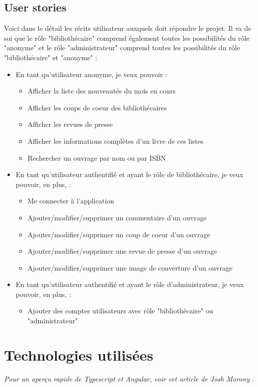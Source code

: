 \documentclass[a4paper, 12pt]{article}
\begin{document}
\subsection{User stories}
Voici dans le détail les récits utilisateur auxquels doit répondre le projet. Il va de soi que le rôle "bibliothécaire"
comprend également toutes les possibilités du rôle "anonyme" et le rôle "administrateur" comprend toutes les possibilités
du rôle "bibliothécaire" et "anonyme" :
\begin{itemize}
    \item En tant qu'utilisateur anonyme, je veux pouvoir :
    \begin{itemize}
        \item Afficher la liste des nouveautés du mois en cours
        \item Afficher les coups de coeur des bibliothécaires
        \item Afficher les revues de presse
        \item Afficher les informations complètes d'un livre de ces listes
        \item Rechercher un ouvrage par nom ou par ISBN
    \end{itemize}
    \item En tant qu'utilisateur authentifié et ayant le rôle de bibliothécaire, je veux pouvoir, en plus, :
    \begin{itemize}
        \item Me connecter à l'application
        \item Ajouter/modifier/supprimer un commentaire d'un ouvrage
        \item Ajouter/modifier/supprimer un coup de coeur d'un ouvrage
        \item Ajouter/modifier/supprimer une revue de presse d'un ouvrage
        \item Ajouter/modifier/supprimer une image de couverture d'un ouvrage
    \end{itemize}
    \item En tant qu'utilisateur authentifié et ayant le rôle d'administrateur, je veux pouvoir, en plus, :
    \begin{itemize}
        \item Ajouter des comptes utilisateurs avec rôle "bibliothécaire" ou "administrateur"
    \end{itemize}
\end{itemize}

\section{Technologies utilisées}
\textit{Pour un aperçu rapide de Typescript et Angular, voir cet article de Josh Morony \cite{ref30}.}
\end{document}
